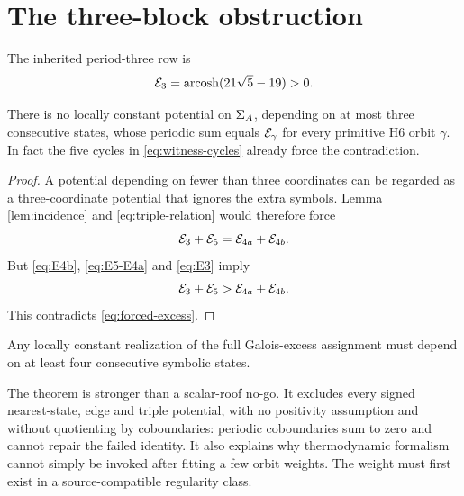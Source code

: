 \section{The three-block obstruction}

The inherited period-three row is
\begin{equation}\label{eq:E3}
 \mathcal E_3=\operatorname{arcosh}(21\sqrt5-19)>0.
\end{equation}

\begin{theorem}\label{thm:three-block}
There is no locally constant potential on \(\Sigma_A\), depending on at most
three consecutive states, whose periodic sum equals \(\mathcal E_\gamma\) for
every primitive H6 orbit \(\gamma\).  In fact the five cycles in
\eqref{eq:witness-cycles} already force the contradiction.
\end{theorem}

\begin{proof}
A potential depending on fewer than three coordinates can be regarded as a
three-coordinate potential that ignores the extra symbols.  Lemma
\ref{lem:incidence} and \eqref{eq:triple-relation} would therefore force
\begin{equation}\label{eq:forced-excess}
 \mathcal E_3+\mathcal E_5=\mathcal E_{4a}+\mathcal E_{4b}.
\end{equation}
But \eqref{eq:E4b}, \eqref{eq:E5-E4a} and \eqref{eq:E3} imply
\[
 \mathcal E_3+\mathcal E_5>\mathcal E_{4a}+\mathcal E_{4b}.
\]
This contradicts \eqref{eq:forced-excess}.
\end{proof}

\begin{corollary}\label{cor:memory}
Any locally constant realization of the full Galois-excess assignment must
depend on at least four consecutive symbolic states.
\end{corollary}

The theorem is stronger than a scalar-roof no-go.  It excludes every signed
nearest-state, edge and triple potential, with no positivity assumption and
without quotienting by coboundaries: periodic coboundaries sum to zero and
cannot repair the failed identity.  It also explains why thermodynamic
formalism cannot simply be invoked after fitting a few orbit weights.  The
weight must first exist in a source-compatible regularity class.
